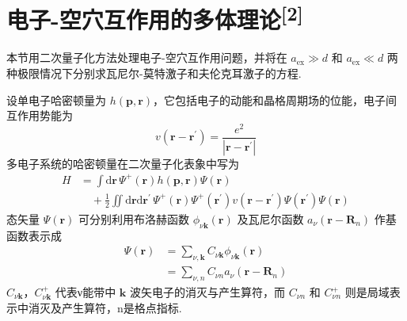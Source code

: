 \section{\texorpdfstring{电子-空穴互作用的多体理论\textsuperscript{[2]}}{电子-空穴互作用的多体理论[2]}}

本节用二次量子化方法处理电子-空穴互作用问题，并将在 $a_{\mathrm{ex}}\gg d$ 和 $a_{\mathrm{ex}}\ll d$ 两种极限情况下分别求瓦尼尔-莫特激子和夫伦克耳激子的方程.

设单电子哈密顿量为 $h(\boldsymbol{p},\boldsymbol{r})$，它包括电子的动能和晶格周期场的位能，电子间互作用势能为
\begin{equation}
  v(\boldsymbol{r}-\boldsymbol{r}^{\prime})
  =\frac{e^{2}}{|\boldsymbol{r}-\boldsymbol{r}^{\prime}|}
\end{equation}
多电子系统的哈密顿量在二次量子化表象中写为
\begin{equation}
\begin{aligned}
  H&=\int\mathrm{d}\boldsymbol{r}\,\varPsi^{+}(\boldsymbol{r})h(\boldsymbol{p},\boldsymbol{r})\varPsi(\boldsymbol{r})\\
  &\quad+\frac{1}{2}\iint\mathrm{d}\boldsymbol{r}\mathrm{d}\boldsymbol{r}^{\prime}\,
  \varPsi^{+}(\boldsymbol{r})\varPsi^{+}(\boldsymbol{r}^{\prime})
  v(\boldsymbol{r}-\boldsymbol{r}^{\prime})
  \varPsi(\boldsymbol{r}^{\prime})\varPsi(\boldsymbol{r})
\end{aligned}
\end{equation}
态矢量 $\varPsi(\boldsymbol{r})$ 可分别利用布洛赫函数 $\phi_{\nu\boldsymbol{k}}(\boldsymbol{r})$ 及瓦尼尔函数 $a_{\nu}(\boldsymbol{r}-\boldsymbol{R}_{n})$ 作基函数表示成
\begin{equation}
\begin{aligned}
  \varPsi(\boldsymbol{r})&=\sum_{\nu,\boldsymbol{k}}C_{\nu\boldsymbol{k}}\phi_{\nu\boldsymbol{k}}(\boldsymbol{r})\\
  &=\sum_{\nu,n}C_{\nu n}a_{\nu}(\boldsymbol{r}-\boldsymbol{R}_{n})
\end{aligned}
\end{equation}
$C_{\nu\boldsymbol{k}}$，$C_{\nu\boldsymbol{k}}^{+}$ 代表ν能带中 $\boldsymbol{k}$ 波矢电子的消灭与产生算符，而 $C_{\nu n}$ 和 $C_{\nu n}^{+}$ 则是局域表示中消灭及产生算符，n是格点指标.

